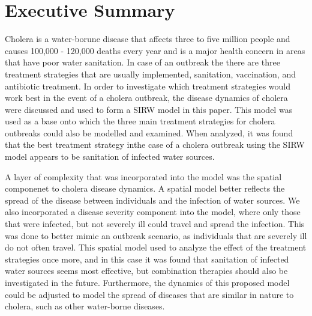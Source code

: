 \newpage
\section{Executive Summary}
\par Cholera is a water-borune disease  that affects three to five million people and causes 100,000 - 120,000 deaths every year and is a major health concern in areas that have poor water sanitation. In case of an outbreak the there are three treatment strategies that are usually implemented, sanitation, vaccination, and antibiotic treatment. In order to investigate which treatment strategies would work best in the event of a cholera outbreak, the disease dynamics of cholera were discussed and used to form a SIRW model in this paper. This model was used as a base onto which the three main treatment strategies for cholera outbreaks could also be modelled and examined. When analyzed, it was found that the best treatment strategy inthe case of a cholera outbreak using the SIRW model appears to be sanitation of infected water sources. 
\par A layer of complexity that was incorporated into the model was the spatial componenet to cholera disease dynamics. A spatial model better reflects the spread of the disease between individuals and the infection of water sources. We also incorporated a disease severity component into the model, where only those that were infected, but not severely ill could travel and spread the infection. This was done to better mimic an outbreak scenario, as individuals that are severely ill do not often travel. This spatial model used to analyze the effect of the treatment strategies once more, and in this case it was found that sanitation of infected water sources seems most effective, but combination therapies should also be investigated in the future. Furthermore, the dynamics of this proposed model could be adjusted to model the spread of diseases that are similar in nature to cholera, such as other water-borne diseases.
